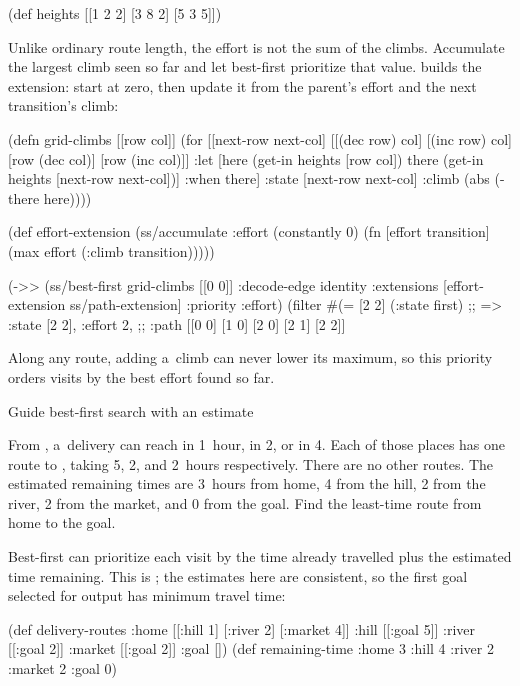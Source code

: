 {{{\begtt {}
(def heights [[1 2 2]
              [3 8 2]
              [5 3 5]])
\endtt

\smallskip
{} Unlike ordinary route length, the effort is not
the sum of the climbs. Accumulate the largest climb seen so far and let
best-first prioritize that value.  builds the extension:
start  at zero, then update it from the parent's effort and
the next transition's climb:

\begtt {}
(defn grid-climbs [[row col]]
  (for [[next-row next-col]
        [[(dec row) col] [(inc row) col]
         [row (dec col)] [row (inc col)]]
        :let [here (get-in heights [row col])
              there (get-in heights [next-row next-col])]
        :when there]
    {:state [next-row next-col]
     :climb (abs (- there here))}))

(def effort-extension
  (ss/accumulate :effort (constantly 0)
                     (fn [effort transition]
                       (max effort (:climb transition)))))

(->> (ss/best-first grid-climbs [[0 0]]
                        {:decode-edge identity
                         :extensions [effort-extension ss/path-extension]
                         :priority :effort})
     (filter #(= [2 2] (:state %
     first)
;; => {:state [2 2], :effort 2,
;;     :path [[0 0] [1 0] [2 0] [2 1] [2 2]]}
\endtt

Along any route, adding a~climb can never lower its maximum, so this
priority orders visits by the best effort found so far.

\secc Guide best-first search with an estimate

 From , a~delivery can reach
 in 1~hour,  in 2, or  in 4.
Each of those places has one route to , taking 5, 2, and 2~hours
respectively. There are no other routes. The estimated remaining times are
3~hours from home, 4 from the hill, 2 from the river, 2 from the market, and
0 from the goal. Find the least-time route from home to the goal.

\smallskip
{} Best-first can prioritize each visit by the time
already travelled plus the estimated time remaining. This is
; the
estimates here are consistent, so the first goal selected for output has minimum travel
time:

\begtt {}
(def delivery-routes
  {:home [[:hill 1] [:river 2] [:market 4]]
   :hill [[:goal 5]]
   :river [[:goal 2]]
   :market [[:goal 2]]
   :goal []})
(def remaining-time
  {:home 3 :hill 4 :river 2 :market 2 :goal 0})

}}}
